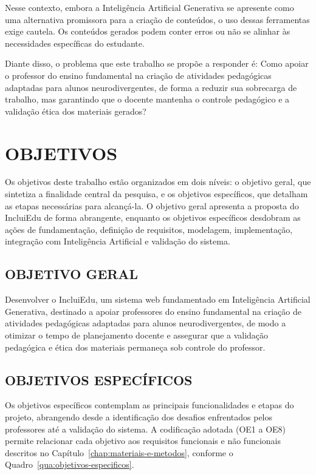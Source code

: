 Nesse contexto, embora a Inteligência Artificial Generativa se apresente como uma alternativa promissora para a criação de conteúdos, o uso dessas ferramentas exige cautela. Os conteúdos gerados podem conter erros ou não se alinhar às necessidades específicas do estudante.

Diante disso, o problema que este trabalho se propõe a responder é: Como apoiar o professor do ensino fundamental na criação de atividades pedagógicas adaptadas para alunos neurodivergentes, de forma a reduzir sua sobrecarga de trabalho, mas garantindo que o docente mantenha o controle pedagógico e a validação ética dos materiais gerados?

\section{OBJETIVOS}

Os objetivos deste trabalho estão organizados em dois níveis: o objetivo geral, que sintetiza a finalidade central da pesquisa, e os objetivos específicos, que detalham as etapas necessárias para alcançá-la. O objetivo geral apresenta a proposta do IncluiEdu de forma abrangente, enquanto os objetivos específicos desdobram as ações de fundamentação, definição de requisitos, modelagem, implementação, integração com Inteligência Artificial e validação do sistema.

\subsection{OBJETIVO GERAL}
Desenvolver o IncluiEdu, um sistema web fundamentado em Inteligência Artificial Generativa, destinado a apoiar professores do ensino fundamental na criação de atividades pedagógicas adaptadas para alunos neurodivergentes, de modo a otimizar o tempo de planejamento docente e assegurar que a validação pedagógica e ética dos materiais permaneça sob controle do professor.
\subsection{OBJETIVOS ESPECÍFICOS}

Os objetivos específicos contemplam as principais funcionalidades e etapas do projeto, abrangendo desde a identificação dos desafios enfrentados pelos professores até a validação do sistema. A codificação adotada (OE1 a OE8) permite relacionar cada objetivo aos requisitos funcionais e não funcionais descritos no Capítulo~\ref{chap:materiais-e-metodos}, conforme o Quadro~\ref{qua:objetivos-especificos}.

